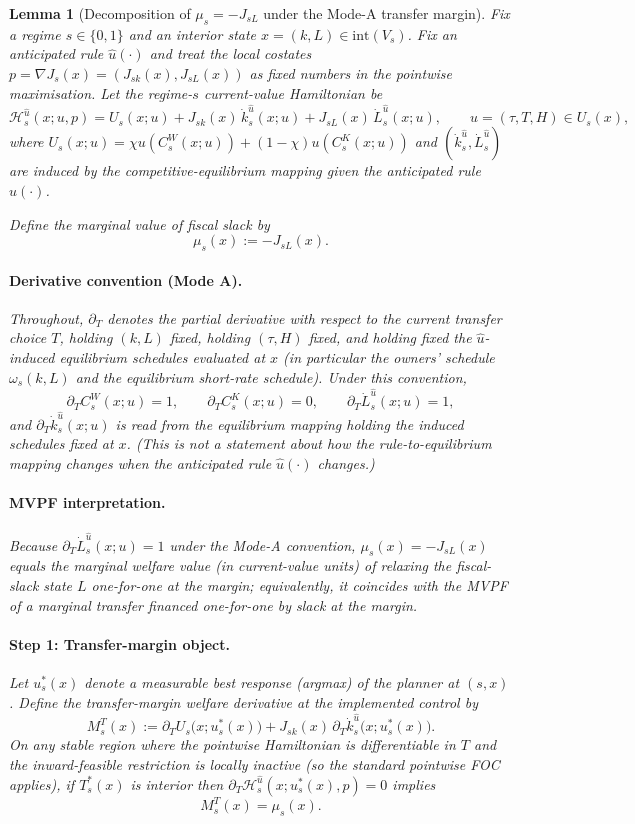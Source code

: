 \documentclass{article}
\newtheorem{lemma}{Lemma}
\begin{document}
\begin{lemma}[Decomposition of $\mu_s=-J_{sL}$ under the Mode-A transfer margin]\label{lem:MU-3term-final}
Fix a regime $s\in\{0,1\}$ and an interior state $x=(k,L)\in\mathrm{int}(V_s)$.
Fix an anticipated rule $\hat u(\cdot)$ and treat the local costates
$p=\nabla J_s(x)=(J_{sk}(x),J_{sL}(x))$ as fixed numbers in the pointwise maximisation.
Let the regime-$s$ current-value Hamiltonian be
\[
\mathcal H_s^{\hat u}(x;u,p)
=
U_s(x;u)
+
J_{sk}(x)\,\dot k_s^{\hat u}(x;u)
+
J_{sL}(x)\,\dot L_s^{\hat u}(x;u),
\qquad u=(\tau,T,H)\in U_s(x),
\]
where $U_s(x;u)=\chi u(C_s^W(x;u))+(1-\chi)u(C_s^K(x;u))$ and
$(\dot k_s^{\hat u},\dot L_s^{\hat u})$ are induced by the competitive-equilibrium mapping
given the anticipated rule $\hat u(\cdot)$.

Define the marginal value of fiscal slack by
\[
\mu_s(x):=-J_{sL}(x).
\]

\paragraph{Derivative convention (Mode A).}
Throughout, $\partial_T$ denotes the \emph{partial} derivative with respect to the current transfer
choice $T$, holding $(k,L)$ fixed, holding $(\tau,H)$ fixed, and holding fixed the $\hat u$-induced
equilibrium schedules evaluated at $x$ (in particular the owners' schedule $\omega_s(k,L)$ and the
equilibrium short-rate schedule).
Under this convention,
\[
\partial_T C_s^W(x;u)=1,\qquad \partial_T C_s^K(x;u)=0,\qquad \partial_T \dot L_s^{\hat u}(x;u)=1,
\]
and $\partial_T \dot k_s^{\hat u}(x;u)$ is read from the equilibrium mapping \emph{holding the induced
schedules fixed at $x$}. (This is not a statement about how the rule-to-equilibrium mapping changes when
the anticipated rule $\hat u(\cdot)$ changes.)

\paragraph{MVPF interpretation.}
Because $\partial_T \dot L_s^{\hat u}(x;u)=1$ under the Mode-A convention, $\mu_s(x)=-J_{sL}(x)$ equals
the marginal welfare value (in current-value units) of relaxing the fiscal-slack state $L$ one-for-one
at the margin; equivalently, it coincides with the MVPF of a marginal transfer financed one-for-one by
slack at the margin.

\paragraph{Step 1: Transfer-margin object.}
Let $u_s^*(x)$ denote a measurable best response (argmax) of the planner at $(s,x)$.
Define the transfer-margin welfare derivative at the implemented control by
\[
M_s^T(x)
:=
\partial_T U_s\big(x;u_s^*(x)\big)
+
J_{sk}(x)\,\partial_T \dot k_s^{\hat u}\big(x;u_s^*(x)\big).
\]
On any stable region where the pointwise Hamiltonian is differentiable in $T$ and the inward-feasible
restriction is locally inactive (so the standard pointwise FOC applies), if $T_s^*(x)$ is interior then
$\partial_T \mathcal H_s^{\hat u}(x;u_s^*(x),p)=0$ implies
\[
M_s^T(x)=\mu_s(x).
\]


\end{lemma}
\end{document}
